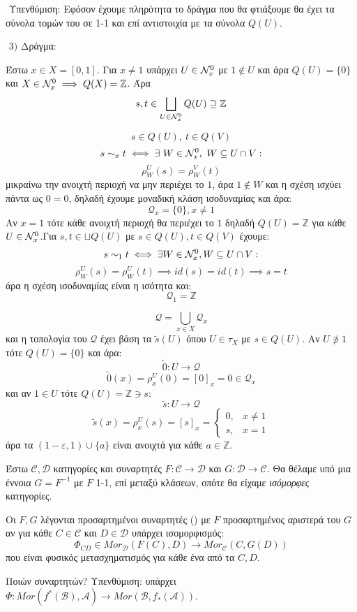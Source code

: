 $ $\newline
Υπενθύμιση: Εφόσον έχουμε πληρότητα το δράγμα που θα φτιάξουμε θα έχει τα σύνολα τομών του σε 1-1 και επί αντιστοιχία με τα σύνολα $Q(U)$.

$ $\newline
$3)$ Δράγμα:

\noindent Έστω $x \in X=[0,1]$. Για $x \neq 1$ υπάρχει $U \in \mathcal{N}^0_x$ με $1 \not \in U$ και άρα $Q(U) = \{0\}$ και $X \in \mathcal{N}^0_x \implies Q(X) = \mathbb{Z}$. Άρα
$$s,t \in \bigsqcup\limits_{U \in \mathcal{N}^0_x} Q(U) \supseteq \mathbb{Z}$$

$$s \in Q(U), \ t \in Q(V)$$
$$s\sim_x t \iff \exists \ W \in \mathcal{N}^0_x, \ W \subseteq U\cap V:$$
$$\rho^U_W(s) = \rho^V_W (t)$$ μικραίνω την ανοιχτή περιοχή να μην περιέχει το $1$, άρα $1 \not \in W$ και η σχέση ισχύει πάντα ως $0=0$, δηλαδή έχουμε μοναδική κλάση ισοδυναμίας και άρα:
$$\mathcal{Q}_x = \{0\}, x\neq 1$$ Αν $x=1$ τότε κάθε ανοιχτή περιοχή θα περιέχει το $1$ δηλαδή $Q(U) = \mathbb{Z}$ για κάθε $U\in\mathcal{N}^0_x$.Για $s,t \in \sqcup Q(U)$ με $s \in Q(U), t \in Q(V)$ έχουμε:
$$s\sim_1 t \iff \exists W \in\mathcal{N}^0_x, W \subseteq U\cap V:$$
$$\rho^U_W(s) = \rho^U_W(t) \implies id(s) = id(t) \implies s=t$$ άρα η σχέση ισοδυναμίας είναι η ισότητα και:
$$\mathcal{Q}_1 = \mathbb{Z}$$

$$\mathcal{Q} = \bigcup\limits_{x \in X}\mathcal{Q}_x$$ και η τοπολογία του $\mathcal{Q}$ έχει βάση τα $\tilde{s}(U)$ όπου $U\in\tau_X$ με $s\in Q(U)$. Αν $U\not \ni 1$ τότε $Q(U) = \{0\}$ και άρα:
$$\tilde{0}: U \longrightarrow \mathcal{Q}$$
$$\tilde{0}(x) = \rho^U_x(0) = [0]_x = 0 \in \mathcal{Q}_x$$ και αν $1\in U$ τότε $Q(U) = \mathbb{Z} \ni s$:
$$\tilde{s}: U \longrightarrow \mathcal{Q}$$
$$\tilde{s}(x) = \rho^U_x(s) = [s]_x = \begin{cases} 0, & x\neq 1 \\ s, & x=1 \end{cases}$$ άρα τα $(1-\varepsilon, 1)\cup\{a\}$ είναι ανοιχτά για κάθε $a \in \mathbb{Z}$.



\pagebreak

\vspace*{0.3cm}
\noindent Έστω $\mathcal C, \mathcal D$ κατηγορίες και συναρτητές $F: \mathcal C \rightarrow \mathcal D$ και $G: \mathcal D \rightarrow \mathcal C$. Θα θέλαμε υπό μια έννοια $G=F^{-1}$ με $F$ 1-1, επί μεταξύ κλάσεων, οπότε θα είχαμε {\em ισόμορφες} κατηγορίες.

\begin{defn}
    Οι $F,G$ λέγονται προσαρτημένοι συναρτητές () με $F$ προσαρτημένος αριστερά του $G$ αν για κάθε $C \in \mathcal C$ και $D \in \mathcal D$ υπάρχει ισομορφισμός:
    $$\Phi_{CD} \in Mor_{\mathcal D}(F(C),D) \longrightarrow Mor_{\mathcal C}(C,G(D))$$ που είναι φυσικός μετασχηματισμός για κάθε ένα από τα $C,D$.
\end{defn}
\noindent Ποιών συναρτητών? Υπενθύμιση: υπάρχει $\Phi: Mor(f^*(\mathcal{B}),\mathcal{A}) \rightarrow Mor(\mathcal{B},f_*(\mathcal{A}))$.



